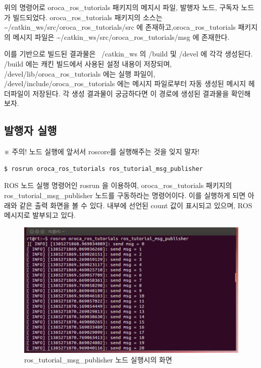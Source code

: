 위의 명령어로 oroca\_ros\_tutorials 패키지의 메지시 파일, 발행자 노드, 구독자 노드가 빌드되었다. 
oroca\_ros\_tutorials 패키지의 소스는 \textasciitilde/catkin\_ws/src/oroca\_ros\_tutorials/src 에 존재하고,oroca\_ros\_tutorials 패키지의 메시지 파일은 \textasciitilde/catkin\_ws/src/oroca\_ros\_tutorials/msg 에 존재한다.

이를 기반으로 빌드된 결과물은 ~/catkin\_ws 의 /build 및 /devel 에 각각 생성된다.
/build 에는 캐킨 빌드에서 사용된 설정 내용이 저장되며, /devel/lib/oroca\_ros\_tutorials 에는 실행 파일이, /devel/include/oroca\_ros\_tutorials 에는 메시지 파일로부터 자동 생성된 메시지 헤더파일이 저장된다. 각 생성 결과물이 궁금하다면 이 경로에 생성된 결과물을 확인해 보자.

\subsection{발행자 실행}

※ 주의! 노드 실행에 앞서서 roscore를 실행해주는 것을 잊지 말자!

\begin{lstlisting}[language=ROS]
$ rosrun oroca_ros_tutorials ros_tutorial_msg_publisher
\end{lstlisting}

ROS 노드 실행 명령어인 rosrun 을 이용하여, oroca\_ros\_tutorials 패키지의 ros\_tutorial\_msg\_publisher 노드를 구동하라는 명령어이다. 이를 실행하게 되면 아래와 같은 출력 화면을 볼 수 있다. 내부에 선언된 count 값이 표시되고 있으며, ROS 메시지로 발부되고 있다. 

\begin{figure}[h]
\centering\includegraphics[width=0.8\columnwidth]{pictures/chapter7/rosrun_ros_tutorial_msg_publisher.png}
\caption{ros\_tutorial\_msg\_publisher 노드 실행시의 화면}
\end{figure}

